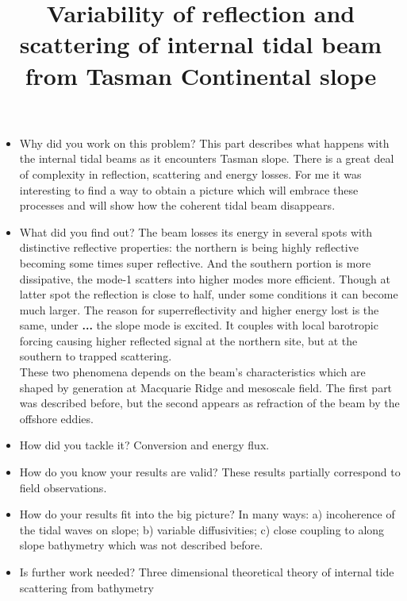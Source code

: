 



\title{Variability of reflection and scattering of internal tidal beam from Tasman Continental slope}
\maketitle

\begin{itemize}
\item Why did you work on this problem?
This part describes what happens with the internal tidal beams as it encounters Tasman slope. There is a great deal of complexity in reflection, scattering and energy losses. For me it was interesting to find a way to obtain a picture which will embrace these processes and will show how the coherent tidal beam disappears.

\item What did you find out?
The beam losses its energy in several spots with distinctive reflective properties: the northern is being highly reflective becoming some times super reflective. And the southern portion is more dissipative, the mode-1 scatters into higher modes more efficient. Though at latter spot the reflection is close to half, under some conditions it can become much larger. The reason for superreflectivity and higher energy lost is the same, under \textbf{...} the slope mode is excited. It couples with local barotropic forcing causing higher reflected signal at the northern site, but at the southern to trapped scattering.\\
These two phenomena depends on the beam's characteristics which are shaped by generation at Macquarie Ridge and mesoscale field. The first part was described before, but the second appears as refraction of the beam by the offshore eddies.

\item How did you tackle it?
Conversion and energy flux.

\item How do you know your results are valid?
These results partially correspond to field observations.
\item How do your results fit into the big picture?
In many ways: a) incoherence of the tidal waves on slope; b) variable diffusivities; c) close coupling to along slope bathymetry which was not described before.

\item Is further work needed?
Three dimensional theoretical theory of internal tide scattering from bathymetry
\end{itemize}


